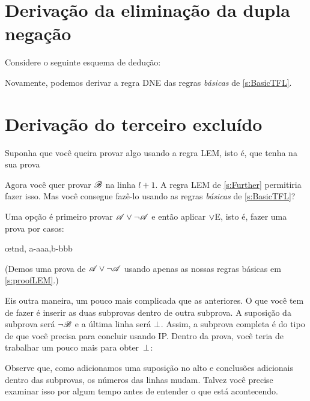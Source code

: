 \section{Derivação da eliminação da dupla negação}
Considere o seguinte esquema de dedução:
	\begin{fitchproof}
	\open
		\AS
	\close
\end{fitchproof}
Novamente, podemos derivar a regra DNE das regras \emph{básicas} de \cref{s:BasicTFL}.

\section{Derivação do terceiro excluído}
Suponha que você queira provar algo usando a regra LEM, isto é, que tenha na sua prova
\begin{fitchproof}
  \open
  \AS
  \close
  \open
  \AS
  \close
\end{fitchproof}
Agora você quer provar $\mathscr{B}$ na linha $l+1$. A regra LEM de
\cref{s:Further} permitiria fazer isso. Mas você consegue fazê-lo usando
as regras \emph{básicas} de \cref{s:BasicTFL}?

Uma opção é primeiro provar $\mathscr{A} \vee \neg\mathscr{A}$ e então aplicar $\vee$E, isto é, fazer uma prova por casos:
\begin{fitchproof}
  \open
  \AS
  \close
  \open
  \AS
  \close
  \ellipsesline
  \oe{tnd, a-aaa,b-bbb}
\end{fitchproof}
(Demos uma prova de $\mathscr{A} \vee \neg\mathscr{A}$ usando apenas as nossas regras básicas em \cref{s:proofLEM}.)

Eis outra maneira, um pouco mais complicada que as anteriores. O que você tem de fazer é inserir as duas subprovas dentro de outra subprova. A suposição da subprova será $\neg \mathscr{B}$ e a última linha será $\bot$. Assim, a subprova completa é do tipo de que você precisa para concluir  usando IP. Dentro da prova, você teria de trabalhar um pouco mais para obter~$\bot$:
\begin{fitchproof}
  \open
  \AS
  \open
  \AS
  \ellipsesline
  \close
  \open
  \AS
  \ellipsesline
  \close
  \close
\end{fitchproof}
Observe que, como adicionamos uma suposição no alto e conclusões adicionais dentro das subprovas, os números das linhas mudam. Talvez você precise examinar isso por algum tempo antes de entender o que está acontecendo.



